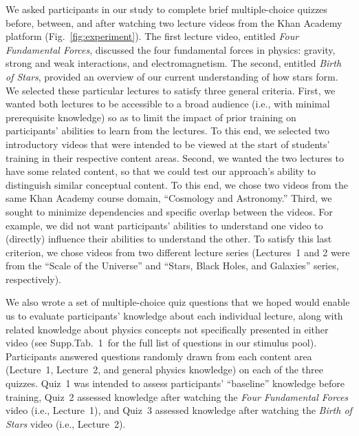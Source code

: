 \documentclass[10pt]{article}
\newcommand{\questions}{1}
\providecommand{\DIFaddtex}[1]{{\protect\color{blue}\uwave{#1}}} %
\providecommand{\DIFaddbegin}{} %
\providecommand{\DIFaddend}{} %
\providecommand{\DIFadd}[1]{\texorpdfstring{\DIFaddtex{#1}}{#1}} %
\newcommand{\DIFaddincludegraphics}[2][]{{\color{blue}\fbox{\DIFOincludegraphics[#1]{#2}}}} %
\DeclareRobustCommand{\DIFaddbegin}{\DIFOaddbegin \let\includegraphics\DIFaddincludegraphics} %
\DeclareRobustCommand{\DIFaddend}{\DIFOaddend \let\includegraphics\DIFOincludegraphics} %
\begin{document}
We asked participants in our study to complete brief multiple-choice quizzes
before, between, and after watching two lecture videos from the Khan
Academy~\citep{Khan04} platform (Fig.~\ref{fig:experiment}). The first lecture
video, entitled \textit{Four Fundamental Forces}, discussed the four
fundamental forces in physics: gravity, strong and weak interactions, and
electromagnetism. The second, entitled \textit{Birth of Stars}, provided an
overview of our current understanding of how stars form. We selected these
particular lectures to satisfy three general criteria. First, we wanted both
lectures to be accessible to a broad audience (i.e., with minimal prerequisite
knowledge) so as to limit the impact of prior training on participants'
abilities to learn from the lectures. To this end, we selected two introductory
videos that were intended to be viewed at the start of students' training in
their respective content areas. Second, we wanted the two lectures to have some
related content, so that we could test our approach's ability to distinguish
similar conceptual content. To this end, we chose two videos from the same Khan
Academy course domain, ``Cosmology and Astronomy.'' Third, we sought to
minimize dependencies and specific overlap between the videos. For example, we
did not want participants' abilities to understand one video to (directly)
influence their abilities to understand the other. To satisfy this last
criterion, we chose videos from two different lecture series (Lectures~1 and 2
were from the ``Scale of the Universe'' and ``Stars, Black Holes, and
Galaxies'' series, respectively).

We also wrote a set of multiple-choice quiz questions that we hoped would
enable us to evaluate participants' knowledge about each individual lecture,
along with related knowledge about physics concepts not specifically presented
in either video (see Supp.\DIFaddbegin \DIFadd{~}\DIFaddend Tab.~\questions~for the full list of questions in
our stimulus pool). Participants answered questions randomly drawn from each
content area (Lecture~1, Lecture~2, and general physics knowledge) on each of
the three quizzes. Quiz~1 was intended to assess participants' ``baseline''
knowledge before training, Quiz~2 assessed knowledge after watching the
\textit{Four Fundamental Forces} video (i.e., Lecture~1), and Quiz~3 assessed
knowledge after watching the \textit{Birth of Stars} video (i.e., Lecture~2).
\end{document}
